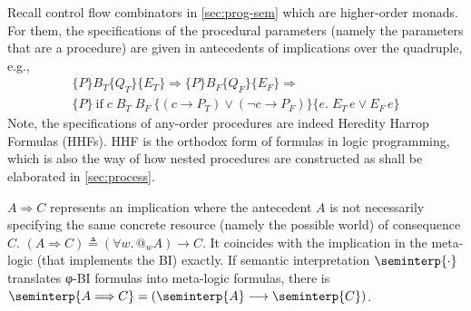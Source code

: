 Recall control flow combinators in \cref{sec:prog-sem} which are higher-order monads.
For them, the specifications of the procedural parameters (namely the parameters that are a procedure) are given in antecedents of implications over the quadruple, e.g.,
\begin{multline*}
  \{P\}B_T\{Q_T\}\{E_T\} \Longrightarrow \{P\}B_F\{Q_F\}\{E_F\} \Longrightarrow \\
      \{P\}~\mathrm{if}\;c\;B_T\;B_F~\{(c \longrightarrow P_T) ∨ (¬c \longrightarrow P_F)\}\{e.\;E_T\,e \lor E_F\,e\}
\end{multline*}
Note, the specifications of any-order procedures are indeed Heredity Harrop Formulas (HHFs).
HHF is the orthodox form of formulas in logic programming, which is also the way of how nested procedures are constructed as shall be elaborated in \cref{sec:process}.

\begin{remark}
$A \Longrightarrow C$ represents an implication where the antecedent $A$ is not necessarily
specifying the same concrete resource (namely the possible world) of consequence $C$.
$(A \Longrightarrow C) \triangleq (∀w.\,@_w A) \longrightarrow C$.
It coincides with the implication in the meta-logic (that implements the BI) exactly.
If semantic interpretation $\seminterp{\cdot}$ translates φ-BI formulas into meta-logic formulas,
  there is $\seminterp{A \Longrightarrow C} = (\seminterp{A} \longrightarrow \seminterp{C})$.
\end{remark}

